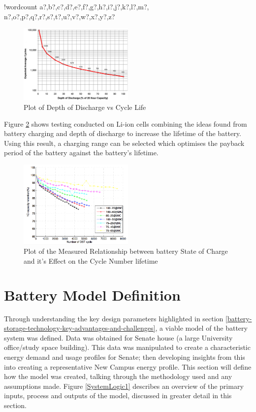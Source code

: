 \documentclass[fontsize=9.5pt]{extarticle}
\numberwithin{figure}{section} %
\newcounter{words}
\newenvironment{counted}{%
  \setcounter{words}{0}
  \SearchList!{wordcount}{\stepcounter{words}}
    {a?,b?,c?,d?,e?,f?,g?,h?,i?,j?,k?,l?,m?,
    n?,o?,p?,q?,r?,s?,t?,u?,v?,w?,x?,y?,z?}
  \UndoBoundary{'}
  \SearchOrder{p;}}{%
  \StopSearching}
\begin{document}
\begin{counted}
\begin{itemize}
  \begin{figure}[H]
    \centering
    \includegraphics[trim = 0 0 0 0, clip, width=0.5\textwidth]{dodLog.png}
    \caption{Plot of Depth of Discharge vs Cycle Life \cite{BatteryL10:online}}
    \label{dodLog}
  \end{figure}
\end{itemize}

Figure \ref{SoCgraph} shows testing conducted on Li-ion cells combining
the ideas found from battery charging and depth of discharge to increase
the lifetime of the battery. Using this result, a charging range can be
selected which optimises the payback period of the battery against the
battery's lifetime.

\begin{figure}[H]
    \centering
    \includegraphics[trim = 0 0 0 0, clip, width=0.5\textwidth]{SoCgraph.png}
    \caption{Plot of the Measured  Relationship between battery State of Charge and it's Effect on the Cycle Number lifetime \cite{xu2016modeling}}
    \label{SoCgraph}
  \end{figure}

\section{Battery Model Definition}\label{battery-model-definition}

Through understanding the key design parameters highlighted in section
\ref{battery-storage-technology-key-advantages-and-challenges}, a viable
model of the battery system was defined. Data was obtained for Senate
house (a large University office/study space building). This data was
manipulated to create a characteristic energy demand and usage profiles
for Senate; then developing insights from this into creating a
representative New Campus energy profile. This section will define how
the model was created, talking through the methodology used and any
assumptions made. Figure \ref{SystemLogic1} describes an overview of the
primary inputs, process and outputs of the model, discussed in greater
detail in this section.


\end{counted}
\end{document}

